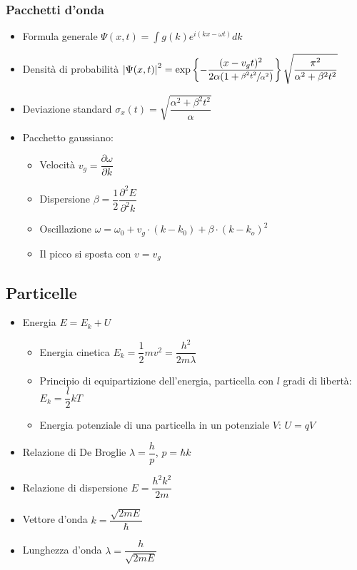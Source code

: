 \documentclass{article}
\begin{document}
\subsubsection{Pacchetti d'onda}
\begin{itemize}
  \item Formula generale \( \Psi(x, t) = \int{g(k) e^{i (kx- \omega t)} dk}  \)
  \item Densità di probabilità \( \left| \Psi(x, t) \right| ^ 2 = \exp\left\{-\dfrac{(x-v_g t) ^ 2}{2 \alpha (1 + \sfrac{\beta^2 t^2}{\alpha^2})}\right\} \sqrt{\dfrac{\pi^2}{\alpha^2 + \beta^2 t^2}} \)
  \item Deviazione standard \( \sigma_x (t) = \sqrt{ \dfrac{\alpha^2 + \beta^2 t^2}{\alpha} } \)
  \item Pacchetto gaussiano:
        \begin{itemize}
          \item Velocità \( v_g = \dfrac{\partial \omega}{\partial k} \)
          \item Dispersione \(\beta = \dfrac{1}{2} \dfrac{\partial ^ 2 E}{\partial ^ 2 k} \)
          \item Oscillazione \( \omega = \omega_0 + v_g \cdot (k - k_0) + \beta \cdot (k - k_o) ^ 2 \)
          \item Il picco si sposta con \( v = v_g \)
        \end{itemize}
\end{itemize}

\subsection{Particelle}
\begin{itemize}
  \item Energia \( E = E_k + U \)
        \begin{itemize}
          \item Energia cinetica \( E_k = \dfrac{1}{2} m v ^ 2 = \dfrac{h ^ 2}{2 m \lambda }\)
          \item Principio di equipartizione dell'energia, particella con \( l \) gradi di libertà: \( E_k = \dfrac{l}{2} k T \)
          \item Energia potenziale di una particella in un potenziale \( V \): \( U = qV \)
        \end{itemize}
  \item Relazione di De Broglie \( \lambda = \dfrac{h}{p} \), \( p = \hbar k \)
  \item Relazione di dispersione \( E = \dfrac{h ^ 2 k ^ 2}{2 m} \)
  \item Vettore d'onda \( k = \dfrac{\sqrt{2mE}}{\hbar} \)
  \item Lunghezza d'onda \( \lambda = \dfrac{h}{\sqrt{2mE}} \)
\end{itemize}
\end{document}
